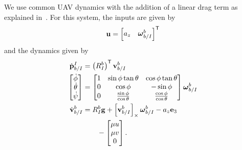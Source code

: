 We use common UAV dynamics with the addition of a linear drag term as explained
in~\cite{leishman2014accel}. For this system, the inputs are given by
\begin{equation}
  \boldsymbol{\mathrm{u}} =
    \begin{bmatrix}
      a_z & \boldsymbol{\mathrm{\omega}}_{b/I}^b 
    \end{bmatrix}^{\mathsf{T}}
\end{equation}
and the dynamics given by
\begin{align}
  \dot{\boldsymbol{\mathrm{p}}}_{b/I}^I
  &=
  \left( R_I^b \right)^{\mathsf{T}} \boldsymbol{\mathrm{v}}_{b/I}^b 
  \\
  \begin{bmatrix}
    \dot{\phi} \\
    \dot{\theta} \\
    \dot{\psi}
  \end{bmatrix}
  &=
  \begin{bmatrix}
    1 & \sin\phi\tan\theta & \cos\phi\tan\theta \\
    0 & \cos\phi & -\sin\phi \\
    0 & \frac{\sin\phi}{\cos\theta} & \frac{\cos\phi}{\cos\theta}
  \end{bmatrix}
  \boldsymbol{\mathrm{\omega}}_{b/I}^b
  \\
  \dot{\boldsymbol{\mathrm{v}}}_{b/I}^b 
  &=
  R_I^b \boldsymbol{\mathrm{g}}
  +
  \left[ \boldsymbol{\mathrm{v}}_{b/I}^b \right]_{\times} \boldsymbol{\mathrm{\omega}}_{b/I}^b
  -
  a_z \boldsymbol{\mathrm{e}}_3 \\
  &\qquad -
  \begin{bmatrix}
    \mu u \\
    \mu v \\
    0 \nonumber
  \end{bmatrix}.
\end{align}

